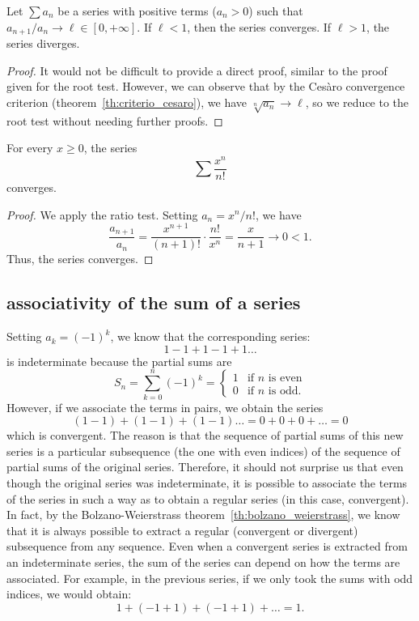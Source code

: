 \begin{theorem}
\mymark{***}
Let $\sum a_n$ be a series with positive terms ($a_n > 0$) such that $a_{n+1} /
a_n \to \ell \in [0,+\infty]$.
If $\ell <1$, then the series converges.
If $\ell > 1$, the series diverges.
\end{theorem}
%
\begin{proof}
\mymark{*}
It would not be difficult to provide a direct proof, similar to the proof given
for the root test.
However, we can observe that by the Cesàro convergence criterion
(theorem~\ref{th:criterio_cesaro}), we have $\sqrt[n]{a_n} \to \ell$, so we
reduce to the root test without needing further proofs.
\end{proof}

\begin{example}
\mymark{***}
For every $x\ge 0$, the series
\[
  \sum \frac{x^n}{n!}
\]
converges.
\end{example}
%
\begin{proof}
We apply the ratio test.
Setting $a_n = x^n / n!$, we have
\[
\frac{a_{n+1}}{a_n}
= \frac{x^{n+1}}{(n+1)!}\cdot \frac{n!}{x^n}
= \frac{x}{n+1} \to 0 < 1.
\]
Thus, the series converges.
\end{proof}

\subsection{associativity of the sum of a series}

\begin{example}
Setting $a_k = (-1)^k$, we know that the corresponding series:
\[
  1 - 1 + 1 - 1 + 1 \dots
\]
is indeterminate because the partial sums are
\[
  S_n = \sum_{k=0}^n (-1)^k
  = \begin{cases}
   1 & \text{if $n$ is even}\\
   0 & \text{if $n$ is odd.}
  \end{cases}
\]
However, if we associate the terms in pairs, we obtain the series
\[
  (1-1) + (1-1) + (1-1) \dots = 0 + 0 + 0 + \dots = 0
\]
which is convergent.
The reason is that the sequence of partial sums of this new series is a
particular subsequence (the one with even indices) of the sequence of partial
sums of the original series. Therefore, it should not surprise us that even
though the original series was indeterminate, it is possible to associate the
terms of the series in such a way as to obtain a regular series (in this case,
convergent).
In fact, by the Bolzano-Weierstrass theorem~\ref{th:bolzano_weierstrass}, we
know that it is always possible to extract a regular (convergent or divergent)
subsequence from any sequence.
Even when a convergent series is extracted from an indeterminate series, the sum
of the series can depend on how the terms are associated.
For example, in the previous series, if we only took the sums with odd indices,
we would obtain:
\[
  1 + (-1+1) + (-1+1) + \dots = 1.
\]
\end{example}

